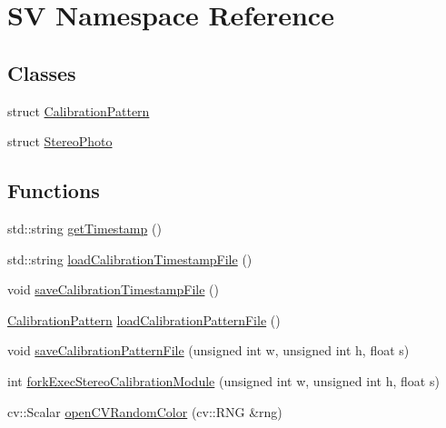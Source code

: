 \hypertarget{namespace_s_v}{\section{S\-V Namespace Reference}
\label{namespace_s_v}
}
\subsection*{Classes}
\begin{DoxyCompactItemize}
\item 
struct \hyperlink{struct_s_v_1_1_calibration_pattern}{Calibration\-Pattern}
\item 
struct \hyperlink{struct_s_v_1_1_stereo_photo}{Stereo\-Photo}
\end{DoxyCompactItemize}
\subsection*{Functions}
\begin{DoxyCompactItemize}
\item 
std\-::string \hyperlink{namespace_s_v_a9f7b63fd7ff59d018c9033a412abc4c0}{get\-Timestamp} ()
\item 
std\-::string \hyperlink{namespace_s_v_ae32886e460af95f632f666beb6846946}{load\-Calibration\-Timestamp\-File} ()
\item 
void \hyperlink{namespace_s_v_a290f15aeacbb1347daab1947fd4f25a4}{save\-Calibration\-Timestamp\-File} ()
\item 
\hyperlink{struct_s_v_1_1_calibration_pattern}{Calibration\-Pattern} \hyperlink{namespace_s_v_a2eeee0cf678d9d481d3d3549b151a4a6}{load\-Calibration\-Pattern\-File} ()
\item 
void \hyperlink{namespace_s_v_ae0b57b979ffff6071335b0e3af71d010}{save\-Calibration\-Pattern\-File} (unsigned int w, unsigned int h, float s)
\item 
int \hyperlink{namespace_s_v_aac43c382d355779c28aac79e5f1a1f2f}{fork\-Exec\-Stereo\-Calibration\-Module} (unsigned int w, unsigned int h, float s)
\item 
cv\-::\-Scalar \hyperlink{namespace_s_v_ad372136d1d33214cd8b7baa169fca11c}{open\-C\-V\-Random\-Color} (cv\-::\-R\-N\-G \&rng)
\end{DoxyCompactItemize}
